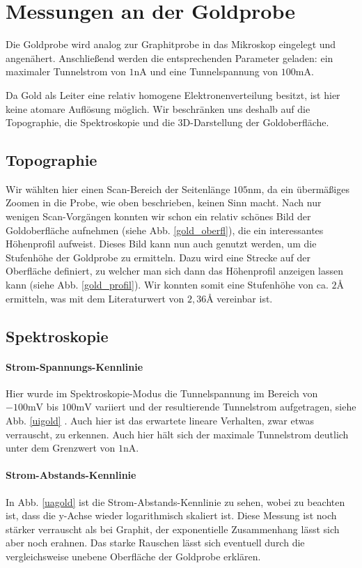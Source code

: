 
\section{Messungen an der Goldprobe}
 Die Goldprobe wird analog zur Graphitprobe in das Mikroskop eingelegt und angenähert. Anschließend werden die entsprechenden Parameter geladen: ein maximaler Tunnelstrom von $1\si{\nano\ampere}$ und eine Tunnelspannung von $100\si{\milli\ampere}$.

Da Gold als Leiter eine relativ homogene Elektronenverteilung besitzt, ist hier keine atomare Auflösung möglich. Wir beschränken uns deshalb auf die Topographie, die Spektroskopie und die 3D-Darstellung der Goldoberfläche.

\subsection{Topographie}
Wir wählten hier einen Scan-Bereich der Seitenlänge $105\si{\nano\meter}$, da ein übermäßiges Zoomen in die Probe, wie oben beschrieben, keinen Sinn macht. Nach nur wenigen Scan-Vorgängen konnten wir schon ein relativ schönes Bild der Goldoberfläche aufnehmen (siehe Abb. \ref{gold_oberfl}), die ein interessantes Höhenprofil aufweist. Dieses Bild kann nun auch genutzt werden, um die Stufenhöhe der Goldprobe zu ermitteln. Dazu wird eine Strecke auf der Oberfläche definiert, zu welcher man sich dann das Höhenprofil anzeigen lassen kann (siehe Abb. \ref{gold_profil}). Wir konnten somit eine Stufenhöhe von ca. $2\si{\angstrom}$ ermitteln, was mit dem Literaturwert von $2,36\si{\angstrom}$ vereinbar ist.

\subsection{Spektroskopie}
\paragraph{Strom-Spannungs-Kennlinie} Hier wurde im Spektroskopie-Modus die Tunnelspannung im Bereich von $-100\si{\milli\volt}$ bis $100\si{\milli\volt}$ variiert und der resultierende Tunnelstrom aufgetragen, siehe Abb. \ref{uigold} . Auch hier ist das erwartete lineare Verhalten, zwar etwas verrauscht, zu erkennen. Auch hier hält sich der maximale Tunnelstrom deutlich unter dem Grenzwert von $1\si{\nano\ampere}$.
\paragraph{Strom-Abstands-Kennlinie}
In Abb. \ref{uagold} ist die Strom-Abstands-Kennlinie zu sehen, wobei zu beachten ist, dass die y-Achse wieder logarithmisch skaliert ist. Diese Messung ist noch stärker verrauscht als bei Graphit, der exponentielle Zusammenhang lässt sich aber noch erahnen. Das starke Rauschen lässt sich eventuell durch die vergleichsweise  unebene Oberfläche der Goldprobe erklären.

